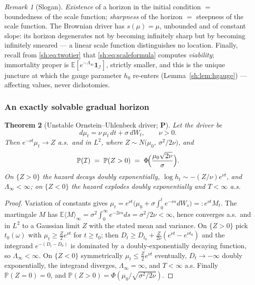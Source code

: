 \documentclass[11pt]{article}
\numberwithin{equation}{section}
\theoremstyle{plain}
\newtheorem{theorem}{Theorem}[section]
\theoremstyle{definition}
\theoremstyle{remark}
\newtheorem{remark}[theorem]{Remark}
\newcommand{\E}{\mathbb{E}}
\newcommand{\PP}{\mathbb{P}}
\newcommand{\one}{\mathbf{1}}
\newcommand{\Imm}{\mathcal{I}}
\begin{document}
\begin{remark}[Slogan]\label{sh:rem:slogan}
\emph{Existence} of a horizon in the initial condition
$=$ boundedness of the scale function;
\emph{sharpness} of the horizon $=$ steepness of the scale function.
The Brownian driver has $s(\mu)=\mu$, unbounded and of constant slope: its
horizon degenerates not by becoming infinitely sharp but by becoming
infinitely smeared --- a linear scale function distinguishes no location.
Finally, recall from \eqref{sh:eq:twotier} that
\eqref{sh:eq:scaleformula} computes \emph{viability}; immortality proper is
$\E[e^{-\Lambda_\infty}\one_\Imm]$, strictly smaller, and this is the
unique juncture at which the gauge parameter $h_0$ re-enters
(Lemma~\ref{sh:lem:hgauge}) --- affecting values, never dichotomies.
\end{remark}

\subsubsection{An exactly solvable gradual horizon}\label{sh:subsub:solvable}

\begin{theorem}[Unstable Ornstein--Uhlenbeck driver; \textbf{P}]
\label{sh:thm:uou}
Let the driver be
\begin{equation}\label{sh:eq:uou}
d\mu_t=\nu\,\mu_t\,dt+\sigma\,dW_t,\qquad \nu>0 .
\end{equation}
Then $e^{-\nu t}\mu_t\to Z$ a.s.\ and in $L^2$, where
$Z\sim N\!\bigl(\mu_0,\ \sigma^2/2\nu\bigr)$, and
\begin{equation}\label{sh:eq:sigmoid}
\PP(\Imm)\;=\;\PP(Z>0)\;=\;\Phi\!\Bigl(\frac{\mu_0\sqrt{2\nu}}{\sigma}\Bigr).
\end{equation}
On $\{Z>0\}$ the hazard decays doubly exponentially,
$\log h_t\sim-(Z/\nu)e^{\nu t}$, and $\Lambda_\infty<\infty$; on
$\{Z<0\}$ the hazard explodes doubly exponentially and $T<\infty$ a.s.
\end{theorem}

\begin{proof}
Variation of constants gives
$\mu_t=e^{\nu t}\bigl(\mu_0+\sigma\int_0^te^{-\nu s}dW_s\bigr)
=:e^{\nu t}M_t$. The martingale $M$ has
$\E\langle M\rangle_\infty=\sigma^2\!\int_0^\infty e^{-2\nu s}ds
=\sigma^2/2\nu<\infty$, hence converges a.s.\ and in $L^2$ to a Gaussian
limit $Z$ with the stated mean and variance. On $\{Z>0\}$ pick
$t_0(\omega)$ with $\mu_t\ge\tfrac Z2e^{\nu t}$ for $t\ge t_0$; then
$D_t\ge D_{t_0}+\tfrac{Z}{2\nu}(e^{\nu t}-e^{\nu t_0})$ and the integrand
$e^{-(D_t-D_0)}$ is dominated by a doubly-exponentially decaying function,
so $\Lambda_\infty<\infty$. On $\{Z<0\}$ symmetrically
$\mu_t\le\tfrac Z2e^{\nu t}$ eventually, $D_t\to-\infty$ doubly
exponentially, the integrand diverges, $\Lambda_\infty=\infty$, and
$T<\infty$ a.s. Finally $\PP(Z=0)=0$, and
$\PP(Z>0)=\Phi(\mu_0/\sqrt{\sigma^2/2\nu})$.
\end{proof}
\end{document}

